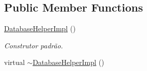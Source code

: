 \subsection*{Public Member Functions}
\begin{DoxyCompactItemize}
\item 
\hyperlink{classDatabaseHelperImpl_a60f67f9c6183e02ffab826bf254fef10}{Database\+Helper\+Impl} ()\hypertarget{classDatabaseHelperImpl_a60f67f9c6183e02ffab826bf254fef10}{}\label{classDatabaseHelperImpl_a60f67f9c6183e02ffab826bf254fef10}

\begin{DoxyCompactList}\small\item\em Construtor padrão. \end{DoxyCompactList}\item 
virtual \hyperlink{classDatabaseHelperImpl_a14d7fa4590316828d2e802bff3512223}{$\sim$\+Database\+Helper\+Impl} ()\hypertarget{classDatabaseHelperImpl_a14d7fa4590316828d2e802bff3512223}{}\label{classDatabaseHelperImpl_a14d7fa4590316828d2e802bff3512223}


\end{DoxyCompactItemize}
